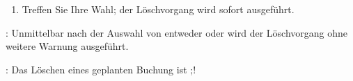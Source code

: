 \begin{enumerate}
\begin{itemize}
		\Note{}: Sie können die Anzeige des Löschdialogfelds in den Grisbi-Einstellungen wieder aktivieren; siehe das Kapitel \vref{setup-operations-remove} .
	\end{itemize}
	\item Treffen Sie Ihre Wahl; der Löschvorgang wird sofort ausgeführt.
\end{enumerate}

\Attention{}: Unmittelbar nach der Auswahl von entweder  oder  wird der Löschvorgang ohne weitere Warnung ausgeführt.

\Attention{}: Das Löschen eines geplanten Buchung ist ;!
